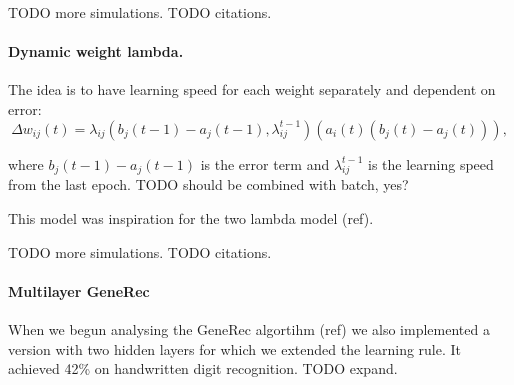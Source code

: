 TODO more simulations. 
TODO citations.  

\paragraph{Dynamic weight lambda.} 

The idea is to have learning speed for each weight separately and dependent on error: 
\begin{equation}
\Delta w_{ij}(t) = \lambda_{ij}(b_j(t-1) - a_j(t-1), \lambda_{ij}^{t-1})(a_i(t)(b_j(t) - a_j(t))),
\end{equation}

where $b_j(t-1) - a_j(t-1)$ is the error term and $\lambda_{ij}^{t-1}$ is the learning speed from the last epoch. 
TODO should be combined with batch, yes? 

This model was inspiration for the two lambda model (ref). 

TODO more simulations. 
TODO citations.  

\paragraph{Multilayer GeneRec}

When we begun analysing the GeneRec algortihm (ref) we also implemented a version with two hidden layers for which we extended the learning rule. It achieved 42\% on handwritten digit recognition. 
TODO expand. 


